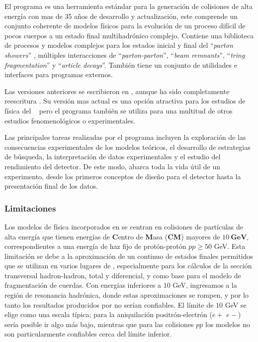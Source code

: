 El programa  \citep{sjostrand_introduction_2015} es una herramienta estándar para la generación de colisiones de alta energía con mas de 35 a\~nos de desarrollo y actualización, este comprende un conjunto coherente de modelos físicos para la evolución de un proceso difícil de pocos cuerpos a un estado final multihadrónico complejo. Contiene una biblioteca de procesos y modelos complejos para los estados inicial y final del ``\textit{parton showers}'' \citep{nagy_what_2018}, múltiples interacciones de  ``\textit{parton-parton}'', ``\textit{beam remnants}'', ``\textit{tring fragmentation}'' y ``\textit{article decays}''. También tiene un conjunto de utilidades e interfaces para programas externos.  

Las versiones anteriores se escribieron en , aunque ha sido completamente reescritura . Su versión mas actual es una opción atractiva para los estudios de física del \LHC ~ pero el programa también se utiliza para una multitud de otros estudios fenomenológicos o experimentales.

Las principales tareas realizadas por el programa incluyen la exploración de las consecuencias experimentales de los modelos teóricos, el desarrollo de estrategias de búsqueda, la interpretación de datos experimentales y el estudio del rendimiento del detector. De este modo, abarca toda la vida útil de un experimento, desde los primeros conceptos de diseño para el detector hasta la presentación final de los datos. %

\subsubsection{Limitaciones}

Los modelos de física incorporados en  se centran en colisiones de partículas de alta energía que tienen energías de \textbf{C}entro de \textbf{M}asa (\textbf{CM}) mayores de $10 ~ \mathbf{GeV}$, correspondientes a una energía de haz fijo de protón-protón $pp \geq 50$ GeV. Esta limitación se debe a la aproximación de un continuo de estados finales permitidos que se utilizan en varios lugares de , especialmente para los cálculos de la sección transversal hadron-hadron, total y diferencial, y como base para el modelo de fragmentación de cuerdas. Con energías inferiores a $10$ GeV, ingresamos a la región de resonancia hadrónica, donde estas aproximaciones se rompen, y por lo tanto los resultados producidos por  no serían confiables. El límite de $10$ GeV se elige como una escala típica; para la aniquilación positrón-electrón ($e+$ $e-$) sería posible ir algo más bajo, mientras que para las colisiones $pp$ los modelos no son particularmente confiables cerca del límite inferior.


